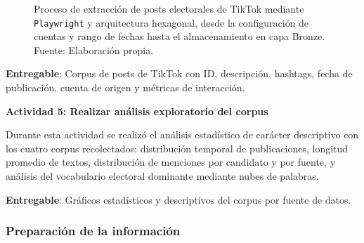 \begin{figure}[!ht]
    \begin{center}
        \resizebox{0.85\textwidth}{!}{}
        \caption[Proceso de recolección del corpus de TikTok mediante scraper Playwright]{Proceso de extracción de posts electorales de TikTok mediante \texttt{Playwright} y arquitectura hexagonal, desde la configuración de cuentas y rango de fechas hasta el almacenamiento en capa Bronze.\\
            Fuente: Elaboración propia.}
        \label{4:fig6b}
    \end{center}
\end{figure}

\textbf{Entregable}: Corpus de posts de TikTok con ID, descripción, hashtags, fecha de publicación, cuenta de origen y métricas de interacción.

\textbf{Actividad 5: Realizar análisis exploratorio del corpus}

Durante esta actividad se realizó el análisis estadístico de carácter descriptivo con los cuatro corpus recolectados: distribución temporal de publicaciones, longitud promedio de textos, distribución de menciones por candidato y por fuente, y análisis del vocabulario electoral dominante mediante nubes de palabras.

\textbf{Entregable}: Gráficos estadísticos y descriptivos del corpus por fuente de datos.
 
\subsubsection{Preparación de la información}
 
